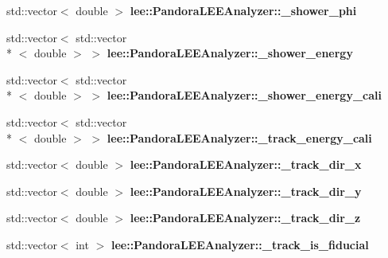 \begin{DoxyCompactItemize}
\item 
\hypertarget{group__lee_ga97c2d25dc1e253d867353b1c4562967c}{std\-::vector$<$ double $>$ {\bfseries lee\-::\-Pandora\-L\-E\-E\-Analyzer\-::\-\_\-shower\-\_\-phi}}\label{group__lee_ga97c2d25dc1e253d867353b1c4562967c}

\item 
\hypertarget{group__lee_gaf1fab9490fef935944f24feb7450f76c}{std\-::vector$<$ std\-::vector\\*
$<$ double $>$ $>$ {\bfseries lee\-::\-Pandora\-L\-E\-E\-Analyzer\-::\-\_\-shower\-\_\-energy}}\label{group__lee_gaf1fab9490fef935944f24feb7450f76c}

\item 
\hypertarget{group__lee_gac5a201dfcee71af90a4076c07a959ebf}{std\-::vector$<$ std\-::vector\\*
$<$ double $>$ $>$ {\bfseries lee\-::\-Pandora\-L\-E\-E\-Analyzer\-::\-\_\-shower\-\_\-energy\-\_\-cali}}\label{group__lee_gac5a201dfcee71af90a4076c07a959ebf}

\item 
\hypertarget{group__lee_gabc42592a0839c13f76a4eb677328cfb3}{std\-::vector$<$ std\-::vector\\*
$<$ double $>$ $>$ {\bfseries lee\-::\-Pandora\-L\-E\-E\-Analyzer\-::\-\_\-track\-\_\-energy\-\_\-cali}}\label{group__lee_gabc42592a0839c13f76a4eb677328cfb3}

\item 
\hypertarget{group__lee_ga8a992d49401db441d8c6e890ce1c1bce}{std\-::vector$<$ double $>$ {\bfseries lee\-::\-Pandora\-L\-E\-E\-Analyzer\-::\-\_\-track\-\_\-dir\-\_\-x}}\label{group__lee_ga8a992d49401db441d8c6e890ce1c1bce}

\item 
\hypertarget{group__lee_ga28bd177e5a7cacbd35fb5aec0865cd57}{std\-::vector$<$ double $>$ {\bfseries lee\-::\-Pandora\-L\-E\-E\-Analyzer\-::\-\_\-track\-\_\-dir\-\_\-y}}\label{group__lee_ga28bd177e5a7cacbd35fb5aec0865cd57}

\item 
\hypertarget{group__lee_ga2349ca54f697314697ff75504bbf042e}{std\-::vector$<$ double $>$ {\bfseries lee\-::\-Pandora\-L\-E\-E\-Analyzer\-::\-\_\-track\-\_\-dir\-\_\-z}}\label{group__lee_ga2349ca54f697314697ff75504bbf042e}

\item 
\hypertarget{group__lee_ga0c6ecffb2e944bd9842a1bbc1f6a05f1}{std\-::vector$<$ int $>$ {\bfseries lee\-::\-Pandora\-L\-E\-E\-Analyzer\-::\-\_\-track\-\_\-is\-\_\-fiducial}}\label{group__lee_ga0c6ecffb2e944bd9842a1bbc1f6a05f1}


\end{DoxyCompactItemize}

